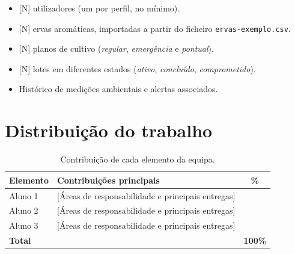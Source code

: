 \begin{itemize}
  \item {}[N] utilizadores (um por perfil, no mínimo).
  \item {}[N] ervas aromáticas, importadas a partir do ficheiro \texttt{ervas-exemplo.csv}.
  \item {}[N] planos de cultivo (\emph{regular}, \emph{emergência} e \emph{pontual}).
  \item {}[N] lotes em diferentes estados (\emph{ativo}, \emph{concluído}, \emph{comprometido}).
  \item Histórico de medições ambientais e alertas associados.
\end{itemize}


\chapter{Distribuição do trabalho}
\label{anexo:distribuicao}


\begin{table}[H]
\centering
\caption{Contribuição de cada elemento da equipa.}
\label{tab:distribuicao}
\renewcommand{\arraystretch}{1.4}
\begin{tabularx}{\linewidth}{l X c}
\toprule
\textbf{Elemento} & \textbf{Contribuições principais} & \textbf{\%} \\
\midrule
Aluno 1 & [Áreas de responsabilidade e principais entregas]   &      \\
Aluno 2 & [Áreas de responsabilidade e principais entregas]   &      \\
Aluno 3 & [Áreas de responsabilidade e principais entregas]   &      \\
\midrule
\textbf{Total} & & \textbf{100\%} \\
\bottomrule
\end{tabularx}
\end{table}
